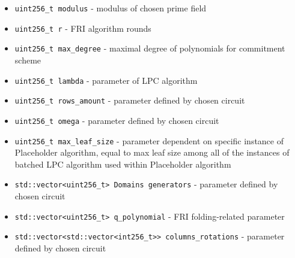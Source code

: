 \begin{itemize}
    \item \texttt{uint256_t modulus} - modulus of chosen prime field
    \item \texttt{uint256_t r} - FRI algorithm rounds
    \item \texttt{uint256_t max\_degree} - maximal degree of polynomials for commitment scheme
    \item \texttt{uint256_t lambda} - parameter of LPC algorithm
    \item \texttt{uint256_t rows\_amount} - parameter defined by chosen circuit
    \item \texttt{uint256_t omega} - parameter defined by chosen circuit
    \item \texttt{uint256_t max\_leaf\_size} - parameter dependent on specific instance of Placeholder algorithm,
        equal to max leaf size among all of the instances of batched LPC algorithm used within Placeholder algorithm
    \item \texttt{std::vector<uint256_t> Domains generators} - parameter defined by chosen circuit 
    \item \texttt{std::vector<uint256_t> q\_polynomial} - FRI folding-related parameter
    \item \texttt{std::vector<std::vector<int256_t>> columns\_rotations} - parameter defined by chosen circuit
\end{itemize}
